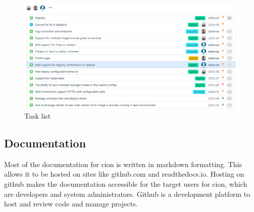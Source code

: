 \begin{figure}[h!]
  \includegraphics[width=\linewidth,height=\textheight,keepaspectratio]{images/task_list.png}
  \caption{Task list}
  \label{fig:tasklist}
\end{figure}

\subsection{Documentation}
Most of the documentation for cion is written in markdown\cite{github-markdown} formatting. This allows it to be hosted on sites like github.com and readthedocs.io. Hosting on github makes the documentation accessible for the target users for cion, which are developers and system administrators. Github is a development platform to host and review code and manage projects\cite{github}.

